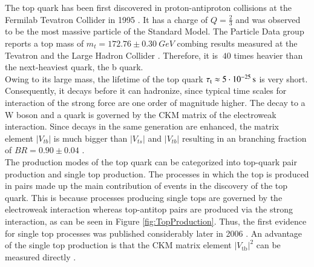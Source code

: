 The top quark has been first discovered in proton-antiproton collisions at the Fermilab Tevatron Collider in 1995 \cite{TopQuark}. It has a charge of $Q=\frac{2}{3}$ and was observed to be the most massive particle of the Standard Model. The Particle Data group reports a top mass of $m_{t} = 172.76 \pm \SI{0.30}{GeV}$ combing results measured at the Tevatron and the Large Hadron Collider \cite{PDG2020}. Therefore, it is $~40$ times heavier than the next-heaviest quark, the b quark. \\
Owing to its large mass, the lifetime of the top quark $\tau_{\text{t}} \approx 5 \cdot \SI[parse-numbers=false]{10^{-25}}{s}$ \cite{PDG2020} is very short. Consequently, it decays before it can hadronize, since typical time scales for interaction of the strong force are one order of magnitude higher. The decay to a W boson and a quark is governed by the CKM matrix \cite{ModernPP} of the electroweak interaction. Since decays in the same generation are enhanced, the matrix element $|V_{tb}|$ is much bigger than $|V_{ts}|$ and $|V_{tb}|$ resulting in an branching fraction of $BR = 0.90 \pm 0.04$ \cite{PDG2020}.  \\
The production modes of the top quark can be categorized into top-quark pair production and single top production. The processes in which the top is produced in pairs made up the main contribution of events in the discovery of the top quark. This is because processes producing single tops are governed by the electroweak interaction whereas top-antitop pairs are produced via the strong interaction, as can be seen in Figure \ref{fig:TopProduction}. Thus, the first evidence for single top processes was published considerably later in 2006 \cite{singlet}. An advantage of the single top production is that the CKM matrix element $|V_{\text{tb}}|^2$ can be measured directly \cite{CKMtb}.

\newpage

